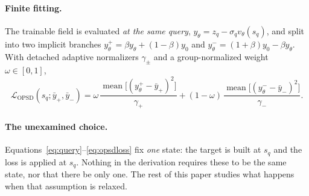 \paragraph{Finite fitting.} The trainable field is evaluated \emph{at the same query},
$y_\theta=z_q-\sigma_q v_\theta(s_q)$, and split into two implicit branches
$y_\theta^{+}=\beta y_\theta+(1-\beta)y_0$ and
$y_\theta^{-}=(1+\beta)y_0-\beta y_\theta$. With detached adaptive normalizers
$\gamma_\pm$ and a group-normalized weight $\omega\in[0,1]$,
\begin{equation}
\mathcal L_{\mathrm{OPSD}}(s_q;\bar y_+,\bar y_-)
=\omega\,\frac{\operatorname{mean}\big[(y_\theta^{+}-\bar y_+)^2\big]}{\gamma_+}
+(1-\omega)\,\frac{\operatorname{mean}\big[(y_\theta^{-}-\bar y_-)^2\big]}{\gamma_-}.
\label{eq:opsdloss}
\end{equation}

\paragraph{The unexamined choice.} Equations~\eqref{eq:query}--\eqref{eq:opsdloss} fix
\emph{one} state: the target is built at $s_q$ and the loss is applied at $s_q$. Nothing
in the derivation requires these to be the same state, nor that there be only one. The
rest of this paper studies what happens when that assumption is relaxed.

